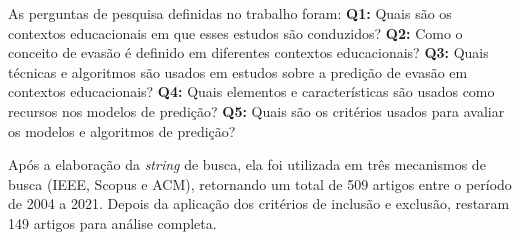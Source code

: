 \documentclass[12pt]{article}
\begin{document}


As perguntas de pesquisa definidas no trabalho foram: \textbf{Q1:} Quais são os contextos educacionais em que esses estudos são conduzidos? \textbf{Q2:} Como o conceito de evasão é definido em diferentes contextos educacionais? \textbf{Q3:} Quais técnicas e algoritmos são usados em estudos sobre a predição de evasão em contextos educacionais? \textbf{Q4:} Quais elementos e características são usados como recursos nos modelos de predição? \textbf{Q5:} Quais são os critérios usados para avaliar os modelos e algoritmos de predição?


Após a elaboração da \textit{string} de busca, ela foi utilizada em três mecanismos de busca (IEEE, Scopus e ACM), retornando um total de 509 artigos entre o período de 2004 a 2021. Depois da aplicação dos critérios de inclusão e exclusão, restaram 149 artigos para análise completa.
\end{document}
